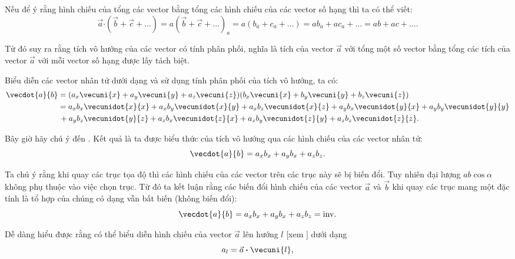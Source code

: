Nếu để ý rằng hình chiếu của tổng các vector bằng tổng các hình chiếu của các vector số hạng thì ta có thể viết:
\begin{equation}\label{eq:1_22}
\vec{a}\boldsymbol{\cdot}(\vec{b}+\vec{c}+\ldots) = a(\vec{b}+\vec{c}+\ldots)_a = a(b_a+c_a+\ldots) = ab_a+ac_a+\ldots = ab+ac+\ldots .
\end{equation}

\noindent
Từ đó suy ra rằng tích vô hướng của các vector có tính phân phối, nghĩa là tích của vector $\vec{a}$ với tổng một số vector bằng tổng các tích của vector $\vec{a}$ với mỗi vector số hạng được lấy tách biệt.

Biểu diễn các vector nhân tử dưới dạng  và sử dụng tính phân phối của tích vô hướng, ta có:
\begin{align*}
\vecdot{a}{b} &= (a_x\vecuni{x} + a_y\vecuni{y} + a_z\vecuni{z})(b_x\vecuni{x} + b_y\vecuni{y} + b_z\vecuni{z})\\
&= a_xb_x\vecunidot{x}{x} + a_xb_y\vecunidot{x}{y} + a_xb_z\vecunidot{x}{z} + a_yb_x\vecunidot{y}{x} + a_yb_y\vecunidot{y}{y}\\
&\,+ a_yb_z\vecunidot{y}{z}+ a_zb_x\vecunidot{z}{x} + a_zb_y\vecunidot{z}{y} + a_zb_z\vecunidot{z}{z}.
\end{align*}

\noindent
Bây giờ hãy chú ý đến . Kết quả là ta được biểu thức của tích vô hướng qua các hình chiếu của các vector nhân tử:
\begin{equation}\label{eq:1_23}
\vecdot{a}{b} = a_xb_x + a_yb_x + a_zb_z.
\end{equation}

\noindent
Ta chú ý rằng khi quay các trục tọa độ thì các hình chiếu của các vector trên các trục này sẽ bị biến đổi. Tuy nhiên đại lượng $ab\cos\alpha$ không phụ thuộc vào việc chọn trục. Từ đó ta kết luận rằng các biến đổi hình chiếu của các vector $\vec{a}$ và $\vec{b}$ khi quay các trục mang một đặc tính là tổ hợp của chúng có dạng  vẫn bất biến (không biến đổi):
\begin{equation}\label{eq:1_24}
\vecdot{a}{b} = a_xb_x + a_yb_x + a_zb_z = \mathrm{inv}.
\end{equation}

Dễ dàng hiểu được rằng có thể biểu diễn hình chiếu của vector $\vec{a}$ lên hướng $l$ [xem ] dưới dạng
\begin{equation}\label{eq:1_25}
a_l = \vec{a}\boldsymbol{\cdot}\vecuni{l},
\end{equation}

